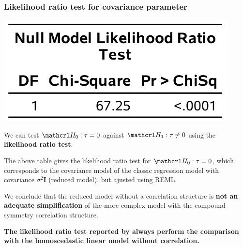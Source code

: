 \documentclass{beamer}
\begin{document}
\begin{frame}[fragile]
\frametitle{Likelihood ratio test for covariance parameter}

\begin{center}
\includegraphics[width = 0.35\linewidth]{img/c5/slides6-e09}
\end{center}
\bi
\item 
We can  test $\Hy_0:\tau=0$ against $\Hy_1: \tau \neq 0$ using the \textbf{likelihood ratio test}.
\item The above table gives the likelihood ratio test for $\Hy_0: \tau=0$, which corresponds to the covariance model of the classic regression model with covariance $\sigma^2\mathbf{I}$ (reduced model), but ajusted using REML.
\item We conclude that the reduced model without a correlation structure is \textbf{not an adequate simplification} of the more complex model with the compound symmetry correlation structure. 
\item \textbf{The likelihood ratio test reported by \SASlang{}{} always perform the comparison with the homoscedastic linear model without correlation.}
\ei
\end{frame}
\end{document}
